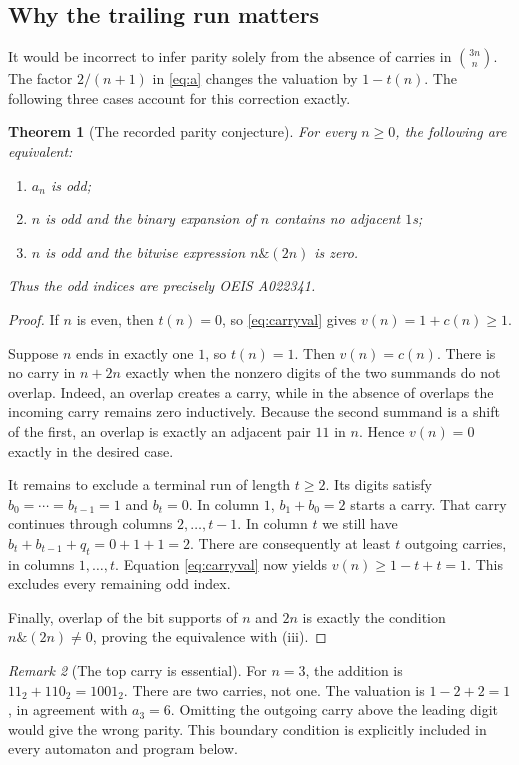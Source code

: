 \documentclass[11pt]{article}
\newtheorem{theorem}{Theorem}[section]
\theoremstyle{definition}\newtheorem{definition}[theorem]{Definition}
\theoremstyle{remark}\newtheorem{remark}[theorem]{Remark}
\begin{document}
\subsection{Why the trailing run matters}
It would be incorrect to infer parity solely from the absence of carries
in $\binom{3n}{n}$. The factor $2/(n+1)$ in \eqref{eq:a} changes the
valuation by $1-t(n)$. The following three cases account for this
correction exactly.

\begin{theorem}[The recorded parity conjecture]\label{thm:parity}
For every $n\geq0$, the following are equivalent:
\begin{enumerate}[label=(\roman*)]
\item $a_n$ is odd;
\item $n$ is odd and the binary expansion of $n$ contains no adjacent $1$s;
\item $n$ is odd and the bitwise expression $n\mathbin{\&}(2n)$ is zero.
\end{enumerate}
Thus the odd indices are precisely OEIS A022341.
\end{theorem}
\begin{proof}
If $n$ is even, then $t(n)=0$, so \eqref{eq:carryval} gives
$v(n)=1+c(n)\geq1$.

Suppose $n$ ends in exactly one $1$, so $t(n)=1$. Then $v(n)=c(n)$.
There is no carry in $n+2n$ exactly when the nonzero digits of the two
summands do not overlap. Indeed, an overlap creates a carry, while in
the absence of overlaps the incoming carry remains zero inductively.
Because the second summand is a shift of the first, an overlap is exactly
an adjacent pair $11$ in $n$. Hence $v(n)=0$ exactly in the desired case.

It remains to exclude a terminal run of length $t\geq2$. Its
digits satisfy $b_0=\cdots=b_{t-1}=1$ and $b_t=0$. In column $1$,
$b_1+b_0=2$ starts a carry. That carry continues through columns
$2,\ldots,t-1$. In column $t$ we still have
$b_t+b_{t-1}+q_t=0+1+1=2$. There are consequently at least $t$ outgoing
carries, in columns $1,\ldots,t$. Equation \eqref{eq:carryval} now yields
$v(n)\geq1-t+t=1$. This excludes every remaining odd index.

Finally, overlap of the bit supports of $n$ and $2n$ is exactly the
condition $n\mathbin{\&}(2n)\ne0$, proving the equivalence with (iii).
\end{proof}

\begin{remark}[The top carry is essential]
For $n=3$, the addition is $11_2+110_2=1001_2$. There are two carries,
not one. The valuation is $1-2+2=1$, in agreement with $a_3=6$.
Omitting the outgoing carry above the leading digit would give the wrong
parity. This boundary condition is explicitly included in every automaton
and program below.
\end{remark}
\end{document}

